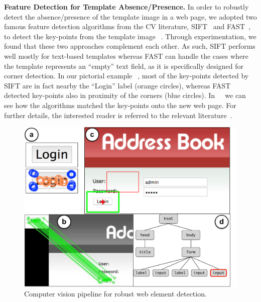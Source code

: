 \noindent
\textbf{Feature Detection for Template Absence/Presence.}
In order to robustly detect the absence/presence of the template image in a web page, we adopted two famous feature detection algorithms from the CV literature, SIFT~\cite{Lowe1999,Lowe2004} and FAST~\cite{rosten2005tracking,rosten2008faster}, to detect the key-points from the template image~\textcircled{}. 
Through experimentation, we found that these two approaches complement each other. As such, SIFT performs well mostly for text-based templates whereas FAST can handle the cases where the template represents an ``empty'' text field, as it is specifically designed for corner detection. In our pictorial example~\textcircled{}, most of the key-points detected by SIFT are in fact nearby the ``Login'' label (orange circles), whereas FAST detected key-points also in proximity of the corners (blue circles). In ~\textcircled{} we can see how the algorithms matched the key-points onto the new web page. For further details, the interested reader is referred to the relevant literature~\cite{Lowe1999,Lowe2004,rosten2005tracking,rosten2008faster}.

\begin{figure}[t]
\centering
\includegraphics[trim={0cm 0cm 0cm 0cm},clip,scale=0.18]{images/cv}
\caption{Computer vision pipeline for robust web element detection.}
\label{fig:cv}
\end{figure}
 

